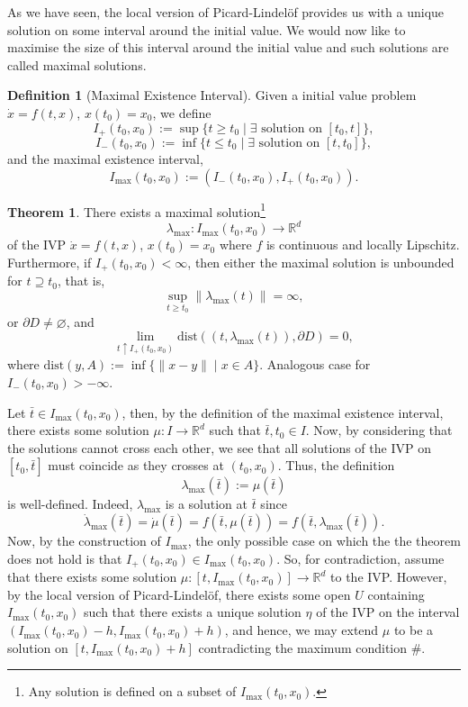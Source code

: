 \documentclass[
]{article}
\theoremstyle{definition}
\newtheorem{theorem}{Theorem}
\theoremstyle{definition}
\newtheorem{definition}{Definition}[section]
\begin{document}
As we have seen, the local version of Picard-Lindelöf provides us with a
unique solution on some interval around the initial value. We would now
like to maximise the size of this interval around the initial value and
such solutions are called maximal solutions.

\begin{definition}[Maximal Existence Interval]
  Given a initial value problem \(\dot x = f(t, x)\), \(x(t_0) = x_0\), 
  we define 
  \[I_+(t_0, x_0) := \sup \{t \ge t_0 \mid \exists \text{ solution on } [t_0, t]\},\]
  \[I_-(t_0, x_0) := \inf \{t \le t_0 \mid \exists \text{ solution on } [t, t_0]\},\]
  and the maximal existence interval,
  \[I_{\max} (t_0, x_0) := (I_-(t_0, x_0), I_+(t_0, x_0)).\]
\end{definition}

\begin{theorem}
  There exists a maximal solution\footnote{Any solution is defined on a subset of
  \(I_{\max}(t_0, x_0)\).} 
  \[\lambda_{\max} : I_{\max} (t_0, x_0) \to \mathbb{R}^d\]
  of the IVP \(\dot x = f(t, x)\), \(x(t_0) = x_0\) where \(f\) is continuous 
  and locally Lipschitz. Furthermore, if \(I_+(t_0, x_0) < \infty\), then 
  either the maximal solution is unbounded for \(t \supseteq t_0\), that is,
  \[\sup_{t \ge t_0}\|\lambda_{\max}(t)\| = \infty,\]
  or \(\partial D \neq \varnothing\), and 
  \[\lim_{t \uparrow I_+(t_0, x_0)} \text{dist}((t, \lambda_{\max}(t)), \partial D) = 0,\]
  where \(\text{dist}(y, A) := \inf\{\|x - y\| \mid x \in A\}\).
  Analogous case for \(I_- (t_0, x_0) > -\infty\).
\end{theorem}
\proof

Let \(\bar{t} \in I_{\max}(t_0, x_0)\), then, by the definition of the
maximal existence interval, there exists some solution
\(\mu : I \to \mathbb{R}^d\) such that \(\bar{t}, t_0 \in I\). Now, by
considering that the solutions cannot cross each other, we see that all
solutions of the IVP on \([t_0, \bar{t}]\) must coincide as they crosses
at \((t_0, x_0)\). Thus, the definition
\[\lambda_{\max}(\bar{t}) := \mu(\bar{t})\] is well-defined. Indeed,
\(\lambda_{\max}\) is a solution at \(\bar{t}\) since
\[\dot \lambda_{\max}(\bar{t}) = \dot \mu(\bar{t}) = f(\bar{t}, \mu(\bar{t})) = 
    f(\bar{t}, \lambda_{\max}(\bar{t})).\] Now, by the construction of
\(I_{\max}\), the only possible case on which the the theorem does not
hold is that \(I_+(t_0, x_0) \in I_{\max}(t_0, x_0)\). So, for
contradiction, assume that there exists some solution
\(\mu : [t, I_{\max}(t_0, x_0)] \to \mathbb{R}^d\) to the IVP. However,
by the local version of Picard-Lindelöf, there exists some open \(U\)
containing \(I_{\max}(t_0, x_0)\) such that there exists a unique
solution \(\eta\) of the IVP on the interval
\((I_{\max}(t_0, x_0) - h, I_{\max}(t_0, x_0) + h)\), and hence, we may
extend \(\mu\) to be a solution on \([t, I_{\max}(t_0, x_0) + h]\)
contradicting the maximum condition \#.
\end{document}
